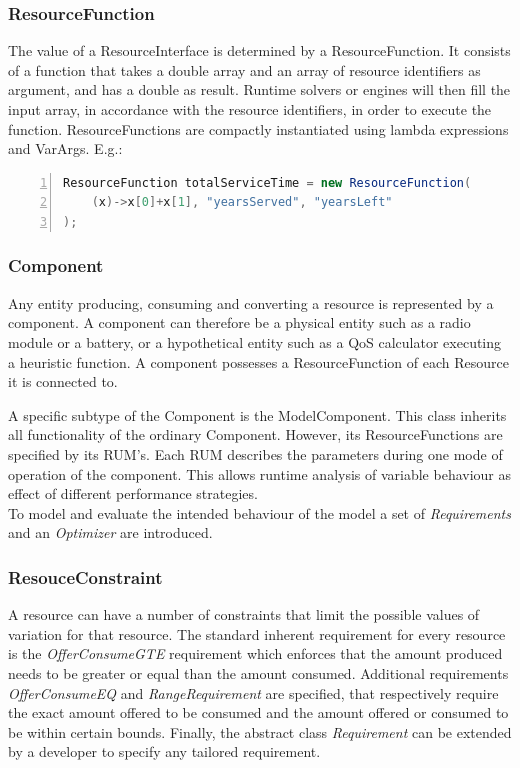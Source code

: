 \subsubsection{ResourceFunction}
The value of a ResourceInterface is determined by a ResourceFunction. It consists of a function that takes a double array and an array of resource identifiers as argument, and has a double as result. Runtime solvers or engines will then fill the input array, in accordance with the resource identifiers, in order to execute the function. ResourceFunctions are compactly instantiated using lambda expressions and VarArgs. E.g.:
\begin{lstlisting}[language=java, frame=single, numbers=left, tabsize=4, basicstyle=\small]
ResourceFunction totalServiceTime = new ResourceFunction(
	(x)->x[0]+x[1], "yearsServed", "yearsLeft"
);
\end{lstlisting}

\subsubsection{Component}
Any entity producing, consuming and converting a resource is represented by a component. A component can therefore be a physical entity such as a radio module or a battery, or a hypothetical entity such as a QoS calculator executing a heuristic function. A component possesses a ResourceFunction of each Resource it is connected to.

A specific subtype of the Component is the ModelComponent. This class inherits all functionality of the ordinary Component. However, its ResourceFunctions are specified by its RUM's. Each RUM describes the parameters during one mode of operation of the component. This allows runtime analysis of variable behaviour as effect of different performance strategies. \\

\noindent To model and evaluate the intended behaviour of the model a set of \emph{Requirements} and an \emph{Optimizer} are introduced.
\subsubsection{ResouceConstraint}
A resource can have a number of constraints that limit the possible values of variation for that resource. The standard inherent requirement for every resource is the \emph{OfferConsumeGTE} requirement which enforces that the amount produced needs to be greater or equal than the amount consumed. Additional requirements \emph{OfferConsumeEQ} and \emph{RangeRequirement} are specified, that respectively require the exact amount offered to be consumed and the amount offered or consumed to be within certain bounds. Finally, the abstract class \emph{Requirement} can be extended by a developer to specify any tailored requirement.

